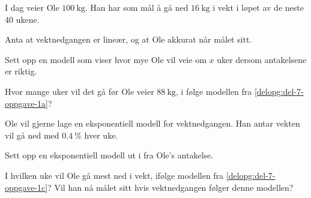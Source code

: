 \Oppgave[7]

I dag veier Ole $\SI{100}{\kg}$. Han har som mål å gå ned $\SI{16}{\kg}$ i vekt
i løpet av de neste $40$ ukene. \bigskip

Anta at vektnedgangen er lineær, og at Ole akkurat når målet sitt.

\begin{oppgaver}
   Sett opp en modell som viser hvor mye Ole vil veie om $x$ uker
  dersom antakelsene er riktig.
  \label{delopg:del-7-oppgave-1a}
\end{oppgaver}

\begin{oppgaver}
   Hvor mange uker vil det gå før Ole veier $\SI{88}{\kg}$, i følge
  modellen fra \cref{delopg:del-7-oppgave-1a}?
\end{oppgaver}

Ole vil gjerne lage en eksponentiell modell for vektnedgangen. Han antar vekten
vil gå ned med $\SI{0.4}{\percent}$ hver uke.

\begin{oppgaver}
   Sett opp en eksponentiell modell ut i fra Ole's antakelse.
  \label{delopg:del-7-oppgave-1c}
\end{oppgaver}

\begin{oppgaver}
   I hvilken uke vil Ole gå mest ned i vekt, ifølge modellen fra
  \cref{delopg:del-7-oppgave-1c}?
  Vil han nå målet sitt hvis vektnedgangen følger denne modellen?
\end{oppgaver}


\Oppgave[4]

